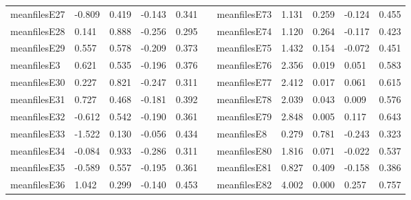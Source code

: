 \begin{table}[h!]
\begin{tabular}{lllllllllll}
meanfilesE27  & -0.809           & 0.419            & -0.143              & 0.341               &           & meanfilesE73  & 1.131            & 0.259            & -0.124              & 0.455               \\
meanfilesE28  & 0.141            & 0.888            & -0.256              & 0.295               &           & meanfilesE74  & 1.120            & 0.264            & -0.117              & 0.423               \\
meanfilesE29  & 0.557            & 0.578            & -0.209              & 0.373               &           & meanfilesE75  & 1.432            & 0.154            & -0.072              & 0.451               \\
meanfilesE3   & 0.621            & 0.535            & -0.196              & 0.376               &           & meanfilesE76  & 2.356            & 0.019            & 0.051               & 0.583               \\
meanfilesE30  & 0.227            & 0.821            & -0.247              & 0.311               &           & meanfilesE77  & 2.412            & 0.017            & 0.061               & 0.615               \\
meanfilesE31  & 0.727            & 0.468            & -0.181              & 0.392               &           & meanfilesE78  & 2.039            & 0.043            & 0.009               & 0.576               \\
meanfilesE32  & -0.612           & 0.542            & -0.190              & 0.361               &           & meanfilesE79  & 2.848            & 0.005            & 0.117               & 0.643               \\
meanfilesE33  & -1.522           & 0.130            & -0.056              & 0.434               &           & meanfilesE8   & 0.279            & 0.781            & -0.243              & 0.323               \\
meanfilesE34  & -0.084           & 0.933            & -0.286              & 0.311               &           & meanfilesE80  & 1.816            & 0.071            & -0.022              & 0.537               \\
meanfilesE35  & -0.589           & 0.557            & -0.195              & 0.361               &           & meanfilesE81  & 0.827            & 0.409            & -0.158              & 0.386               \\
meanfilesE36  & 1.042            & 0.299            & -0.140              & 0.453               &           & meanfilesE82  & 4.002            & 0.000            & 0.257               & 0.757               \\

\end{tabular}
\end{table}
